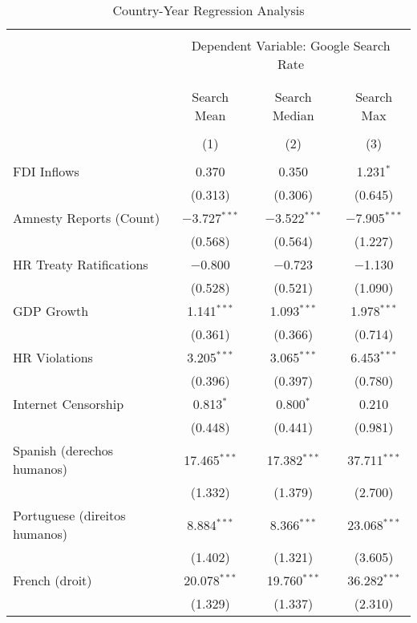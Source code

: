 
\begin{table}[!htbp] \centering 
  \caption{Country-Year Regression Analysis} 
  \label{} 
\begin{tabular}{@{\extracolsep{5pt}}lccc} 
\\[-1.8ex]\hline 
\hline \\[-1.8ex] 
 & \multicolumn{3}{c}{Dependent Variable: Google Search Rate} \\ 
\cline{2-4} 
\\[-1.8ex] & \multicolumn{3}{c}{ } \\ 
 & Search Mean & Search Median & Search Max \\ 
\\[-1.8ex] & (1) & (2) & (3)\\ 
\hline \\[-1.8ex] 
 FDI Inflows & 0.370 & 0.350 & 1.231$^{*}$ \\ 
  & (0.313) & (0.306) & (0.645) \\ 
  Amnesty Reports (Count) & $-$3.727$^{***}$ & $-$3.522$^{***}$ & $-$7.905$^{***}$ \\ 
  & (0.568) & (0.564) & (1.227) \\ 
  HR Treaty Ratifications & $-$0.800 & $-$0.723 & $-$1.130 \\ 
  & (0.528) & (0.521) & (1.090) \\ 
  GDP Growth & 1.141$^{***}$ & 1.093$^{***}$ & 1.978$^{***}$ \\ 
  & (0.361) & (0.366) & (0.714) \\ 
  HR Violations & 3.205$^{***}$ & 3.065$^{***}$ & 6.453$^{***}$ \\ 
  & (0.396) & (0.397) & (0.780) \\ 
  Internet Censorship & 0.813$^{*}$ & 0.800$^{*}$ & 0.210 \\ 
  & (0.448) & (0.441) & (0.981) \\ 
  Spanish (derechos humanos) & 17.465$^{***}$ & 17.382$^{***}$ & 37.711$^{***}$ \\ 
  & (1.332) & (1.379) & (2.700) \\ 
  Portuguese (direitos humanos) & 8.884$^{***}$ & 8.366$^{***}$ & 23.068$^{***}$ \\ 
  & (1.402) & (1.321) & (3.605) \\ 
  French (droit) & 20.078$^{***}$ & 19.760$^{***}$ & 36.282$^{***}$ \\ 
  & (1.329) & (1.337) & (2.310) \\ 

\end{tabular}
\end{table}

